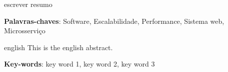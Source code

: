 \setlength{\absparsep}{18pt} %
\begin{resumo}

  escrever resumo

  \textbf{Palavras-chaves}: Software, Escalabilidade, Performance, Sistema web, Microsserviço

\end{resumo}

\begin{resumo}[Abstract]
 \begin{otherlanguage*}{english}
   This is the english abstract.

   \vspace{\onelineskip}

   \noindent
   \textbf{Key-words}: key word 1, key word 2, key word 3
 \end{otherlanguage*}
\end{resumo}
